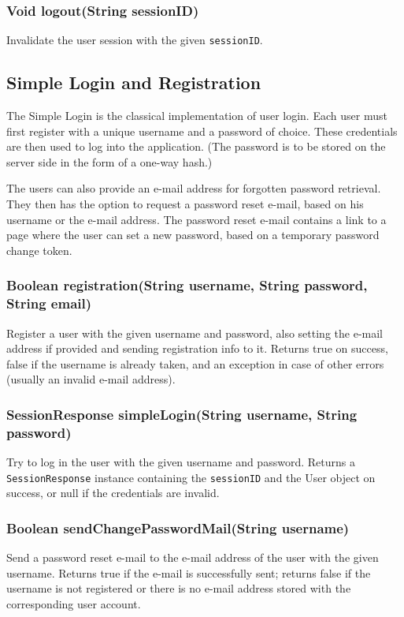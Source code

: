 {\subsubsection{Void logout(String sessionID)}
Invalidate the user session with the given {\tt sessionID}.

\subsection{Simple Login and Registration}
\label{subsec:simple_login}

The Simple Login is the classical implementation of user login. Each user must first register with a unique username and a password of choice. These credentials are then used to log into the application. (The password is to be stored on the server side in the form of a one-way hash.)

The users can also provide an e-mail address for forgotten password retrieval. They then has the option to request a password reset e-mail, based on his username or the e-mail address. The password reset e-mail contains a link to a page where the user can set a new password, based on a temporary password change token.

\subsubsection{Boolean registration(String username, String password, String email)}
Register a user with the given username and password, also setting the e-mail address if provided and sending registration info to it.
Returns true on success, false if the username is already taken, and an exception in case of other errors (usually an invalid e-mail address).

\subsubsection{SessionResponse simpleLogin(String username, String password)}
Try to log in the user with the given username and password.
Returns a {\tt SessionResponse} instance containing the {\tt sessionID} and the User object on success, or null if the credentials are invalid.

\subsubsection{Boolean sendChangePasswordMail(String username)}
Send a password reset e-mail
to the e-mail address of the user with the given username.
Returns true if the e-mail is successfully sent;
returns false if the username is not registered or there is no e-mail address stored with the corresponding user account.

}
